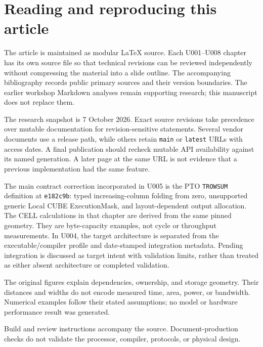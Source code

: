 \section{Reading and reproducing this article}
\label{sec:reproducibility}

The article is maintained as modular LaTeX source. Each U001--U008 chapter has its own source file so that technical revisions can be reviewed independently without compressing the material into a slide outline. The accompanying bibliography records public primary sources and their version boundaries. The earlier workshop Markdown analyses remain supporting research; this manuscript does not replace them.

The research snapshot is 7 October 2026. Exact source revisions take precedence over mutable documentation for revision-sensitive statements. Several vendor documents use a release path, while others retain \texttt{main} or \texttt{latest} URLs with access dates. A final publication should recheck mutable API availability against its named generation. A later page at the same URL is not evidence that a previous implementation had the same feature.

The main contract correction incorporated in U005 is the PTO \texttt{TROWSUM} definition at \texttt{e182c9b}: typed increasing-column folding from zero, unsupported generic Local CUBE ExecutionMask, and layout-dependent output allocation. The CELL calculations in that chapter are derived from the same pinned geometry. They are byte-capacity examples, not cycle or throughput measurements. In U004, the target architecture is separated from the executable/compiler profile and date-stamped integration metadata. Pending integration is discussed as target intent with validation limits, rather than treated as either absent architecture or completed validation.

The original figures explain dependencies, ownership, and storage geometry. Their distances and widths do not encode measured time, area, power, or bandwidth. Numerical examples follow their stated assumptions; no model or hardware performance result was generated.

Build and review instructions accompany the source. Document-production checks do not validate the processor, compiler, protocols, or physical design.

